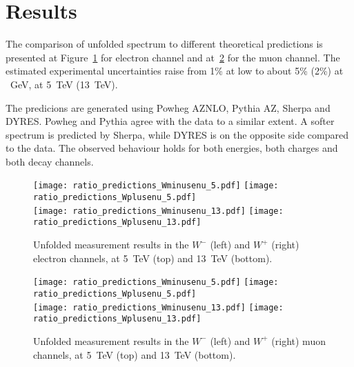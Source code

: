 \section{Results}
The comparison of unfolded spectrum to different theoretical predictions is presented at Figure~\ref{fig:results_predictions_elec} for electron channel and at~\ref{fig:results_predictions_muon} for the muon channel. The estimated experimental uncertainties raise from 1\% at low \ptw to about 5\% (2\%) at ~GeV, at 5~TeV (13~TeV).

The predicions are generated using Powheg AZNLO, Pythia AZ, Sherpa and DYRES. Powheg and Pythia agree with the data to a similar extent. A softer spectrum is predicted by Sherpa, while DYRES is on the opposite side compared to the data. The observed behaviour holds for both energies, both charges and both decay channels.

\begin{figure}[h]
	\centering
	{\texttt{[image: ratio\_predictions\_Wminusenu\_5.pdf]}}
	{\texttt{[image: ratio\_predictions\_Wplusenu\_5.pdf]}} \\
	{\texttt{[image: ratio\_predictions\_Wminusenu\_13.pdf]}}
	{\texttt{[image: ratio\_predictions\_Wplusenu\_13.pdf]}}
	\caption{Unfolded measurement results in the $W^-$ (left) and $W^+$ (right) electron channels, at 5~TeV (top) and 13~TeV (bottom).}
	\label{fig:results_predictions_elec}
\end{figure}

\begin{figure}[h]
	\centering
	{\texttt{[image: ratio\_predictions\_Wminusenu\_5.pdf]}}
	{\texttt{[image: ratio\_predictions\_Wplusenu\_5.pdf]}} \\
	{\texttt{[image: ratio\_predictions\_Wminusenu\_13.pdf]}}
	{\texttt{[image: ratio\_predictions\_Wplusenu\_13.pdf]}}
	\caption{Unfolded measurement results in the $W^-$ (left) and $W^+$ (right) muon channels, at 5~TeV (top) and 13~TeV (bottom).}
	\label{fig:results_predictions_muon}
\end{figure}